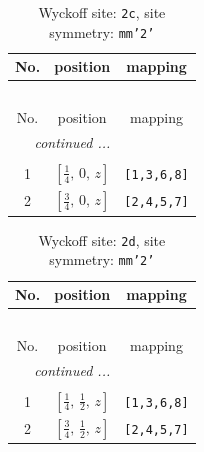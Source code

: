 \documentclass[fleqn,8pt]{jsarticle}
\begin{document}
\begin{longtable}{ccc}
\caption{Wyckoff site: {\tt 2c}, site symmetry: {\tt mm'2'}}
 \\
 \hline \hline
No. & position & mapping \\ \hline \endfirsthead

\multicolumn{2}{l}{\tablename\ \thetable{}} \\
 \hline \hline
No. & position & mapping \\ \hline \endhead

 \hline \hline
\multicolumn{2}{r}{\footnotesize\it continued ...} \\ \endfoot

 \hline \hline
\multicolumn{2}{r}{} \\ \endlastfoot

1 & $\left[ \frac{1}{4},\, 0,\, z \right]$ & {\tt [1,3,6,8]} \\ \hline
2 & $\left[ \frac{3}{4},\, 0,\, z \right]$ & {\tt [2,4,5,7]} \\
\end{longtable}
\renewcommand{\arraystretch}{1.2}
\begin{longtable}{ccc}
\caption{Wyckoff site: {\tt 2d}, site symmetry: {\tt mm'2'}}
 \\
 \hline \hline
No. & position & mapping \\ \hline \endfirsthead

\multicolumn{2}{l}{\tablename\ \thetable{}} \\
 \hline \hline
No. & position & mapping \\ \hline \endhead

 \hline \hline
\multicolumn{2}{r}{\footnotesize\it continued ...} \\ \endfoot

 \hline \hline
\multicolumn{2}{r}{} \\ \endlastfoot

1 & $\left[ \frac{1}{4},\, \frac{1}{2},\, z \right]$ & {\tt [1,3,6,8]} \\ \hline
2 & $\left[ \frac{3}{4},\, \frac{1}{2},\, z \right]$ & {\tt [2,4,5,7]} \\
\end{longtable}
\renewcommand{\arraystretch}{1.2}
\end{document}
